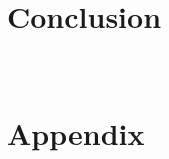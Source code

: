 \documentclass[parskip=full]{scrartcl}
\begin{document}
\section{Conclusion}~\label{sec:conclusion}




\appendix

\section{Appendix}


\end{document}
